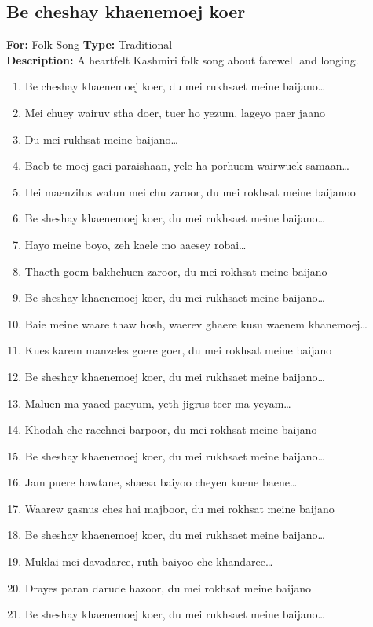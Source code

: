 \documentclass[12pt]{article}
\newcommand{\bigroman}[1]{\fontsize{16pt}{18pt}\selectfont\RaggedRight #1}
\begin{document}
\begin{multicols}{2}
\subsection*{Be cheshay khaenemoej koer}
\textbf{For:} Folk Song \quad \textbf{Type:} Traditional\\
\textbf{Description:} A heartfelt Kashmiri folk song about farewell and longing.

\begin{multicols}{2}
\begin{enumerate}[leftmargin=*, label=\arabic*., font=\fontsize{16pt}{18pt}\selectfont]
  \item \bigroman{Be cheshay khaenemoej koer, du mei rukhsaet meine baijano…}
  \item \bigroman{Mei chuey wairuv stha doer, tuer ho yezum, lageyo paer jaano}
  \item \bigroman{Du mei rukhsat meine baijano…}
  \item \bigroman{Baeb te moej gaei paraishaan, yele ha porhuem wairwuek samaan…}
  \item \bigroman{Hei maenzilus watun mei chu zaroor, du mei rokhsat meine baijanoo}
  \item \bigroman{Be sheshay khaenemoej koer, du mei rukhsaet meine baijano…}
  \item \bigroman{Hayo meine boyo, zeh kaele mo aaesey robai…}
  \item \bigroman{Thaeth goem bakhchuen zaroor, du mei rokhsat meine baijano}
  \item \bigroman{Be sheshay khaenemoej koer, du mei rukhsaet meine baijano…}
  \item \bigroman{Baie meine waare thaw hosh, waerev ghaere kusu waenem khanemoej…}
  \item \bigroman{Kues karem manzeles goere goer, du mei rokhsat meine baijano}
  \item \bigroman{Be sheshay khaenemoej koer, du mei rukhsaet meine baijano…}
  \item \bigroman{Maluen ma yaaed paeyum, yeth jigrus teer ma yeyam…}
  \item \bigroman{Khodah che raechnei barpoor, du mei rokhsat meine baijano}
  \item \bigroman{Be sheshay khaenemoej koer, du mei rukhsaet meine baijano…}
  \item \bigroman{Jam puere hawtane, shaesa baiyoo cheyen kuene baene…}
  \item \bigroman{Waarew gasnus ches hai majboor, du mei rokhsat meine baijano}
  \item \bigroman{Be sheshay khaenemoej koer, du mei rukhsaet meine baijano…}
  \item \bigroman{Muklai mei davadaree, ruth baiyoo che khandaree…}
  \item \bigroman{Drayes paran darude hazoor, du mei rokhsat meine baijano}
  \item \bigroman{Be sheshay khaenemoej koer, du mei rukhsaet meine baijano…}
\end{enumerate}


\end{multicols}
\end{multicols}
\end{document}
